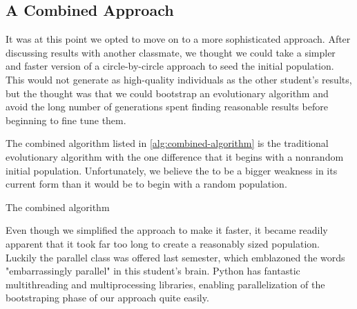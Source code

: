\documentclass{article}
\begin{document}
\subsection{A Combined Approach}\label{sec:strat:combined-approach}

It was at this point we opted to move on to a more sophisticated approach. After discussing results
with another classmate, we thought we could take a simpler and faster version of a circle-by-circle
approach to seed the initial population. This would not generate as high-quality individuals as the
other student's results, but the thought was that we could bootstrap an evolutionary algorithm and
avoid the long number of generations spent finding reasonable results before beginning to fine tune
them.

The combined algorithm listed in \autoref{alg:combined-algorithm} is the traditional evolutionary
algorithm with the one difference that it begins with a nonrandom initial population.
Unfortunately, we believe the to be a bigger weakness in its current form than it would be to begin
with a random population.
\begin{algorithm}[h]
    \begin{algorithmic}
                \Statex
            \EndFor
            \State{}
        \EndFunction{}
    \end{algorithmic}
    \caption{The combined algorithm}\label{alg:combined-algorithm}
\end{algorithm}

Even though we simplified the approach to make it faster, it became readily apparent that it took
far too long to create a reasonably sized population. Luckily the parallel class was offered last
semester, which emblazoned the words "embarrassingly parallel" in this student's brain. Python has
fantastic multithreading and multiprocessing libraries, enabling parallelization of the
bootstraping phase of our approach quite easily.
\end{document}

